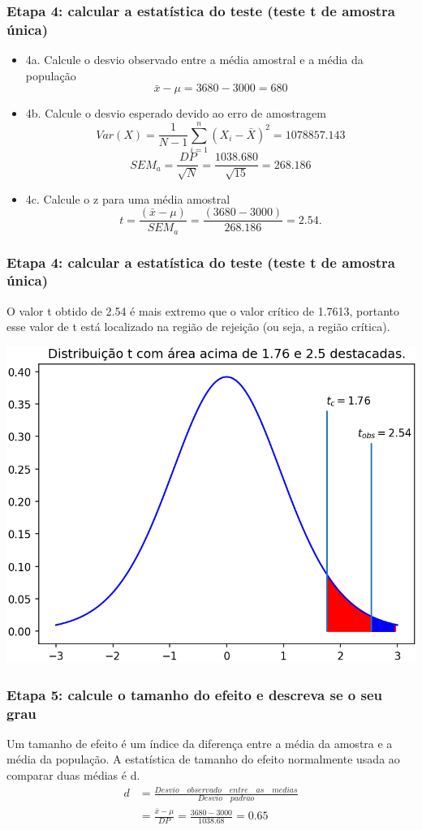 \documentclass[11pt]{beamer}
\begin{document}
\begin{frame}
\frametitle{Etapa 4: calcular a estatística do teste (teste t de amostra única)}
\begin{itemize}
\item 4a. Calcule o desvio observado entre a média amostral e a média da população
\[\bar{x} - \mu = 3680-3000 = 680\]
\item 4b. Calcule o desvio esperado devido ao erro de amostragem
\[Var(X) = \frac{1}{N-1}\sum_{i=1}^n(X_i - \bar{X})^2 = 1078857.143\]
\[SEM_a = \frac{DP}{\sqrt{N}} = \frac{1038.680}{\sqrt{15}} = 268.186\]
\item 4c. Calcule o z para uma média amostral
\[t = \frac{(\bar{x} - \mu)}{SEM_a} = \frac{(3680-3000)}{268.186} = 2.54.\]
\end{itemize}
\end{frame}

\begin{frame}
\frametitle{Etapa 4: calcular a estatística do teste (teste t de amostra única)}
O valor t obtido de 2.54 é mais extremo que o valor crítico de 1.7613, portanto esse valor de t está localizado na região de rejeição (ou seja, a região crítica).
\begin{center}\includegraphics[width=0.55\linewidth]{figs/regiao_critica_observada_t} \end{center}

\end{frame}


\begin{frame}
\frametitle{Etapa 5: calcule o tamanho do efeito e descreva se o seu grau}
Um tamanho de efeito é um índice da diferença entre a média da amostra e a média da população. A estatística de tamanho do efeito normalmente usada ao comparar duas médias é d. 
\begin{align*}
d &= \frac{Desvio\quad observado\quad entre\quad as\quad medias}{Desvio\quad padrao}\\
  &= \frac{\bar{x}-\mu}{DP} = \frac{3680 - 3000}{1038.68} = 0.65
\end{align*}

\end{frame}
\end{document}
